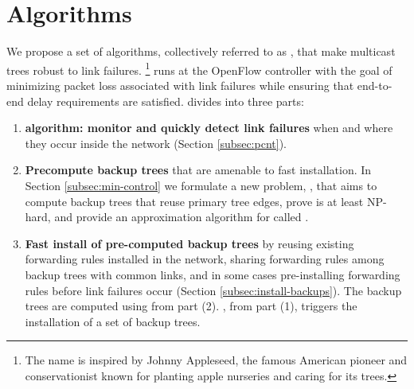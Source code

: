 \section{Algorithms}
\label{sec:algs}

We propose a set of algorithms, collectively referred to as \mdrs, that make multicast trees robust to link failures.  
\footnote{The name \mdr is inspired by Johnny Appleseed, the famous American pioneer and conservationist known for planting apple nurseries and caring for its trees. }
\mdr runs at the OpenFlow controller with the goal of minimizing packet loss associated with link failures while ensuring that end-to-end delay requirements are satisfied.
\mdr divides into three parts: %
\begin{enumerate}
	\item {\bf \pcnt algorithm: monitor and quickly detect link failures} when and where they occur inside the network (Section \ref{subsec:pcnt}).
	
	\item {\bf Precompute backup trees} that are amenable to fast installation.  In Section \ref{subsec:min-control} we formulate a new problem, \mcs, that aims to compute backup trees that
	reuse primary tree edges, prove \mc is at least NP-hard, and provide an approximation algorithm for \mc called \steiners.

	\item {\bf Fast install of pre-computed backup trees} by reusing existing forwarding rules installed in the network, sharing forwarding rules among backup trees with common links, and
	in some cases pre-installing forwarding rules before link failures occur (Section \ref{subsec:install-backups}).  
	The backup trees are computed using \steiner from part (2). \pcnts, from part (1), triggers the installation of a set of backup trees.

	
\end{enumerate}



